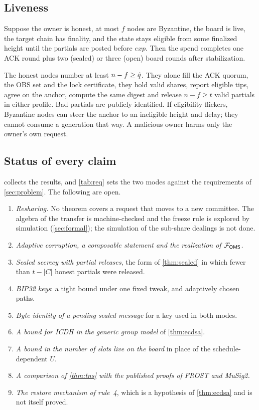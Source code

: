 \subsection{Liveness}

\begin{proposition}\label{prop:live}
Suppose the owner is honest, at most $f$ nodes are Byzantine, the board is live, the target chain has finality, and the state stays eligible from some finalized height until the partials are posted before $exp$. Then the spend completes one ACK round plus two (sealed) or three (open) board rounds after stabilization.
\end{proposition}

The honest nodes number at least $n - f \ge \hat{q}$. They alone fill the ACK quorum, the OBS set and the lock certificate, they hold valid shares, report eligible tips, agree on the anchor, compute the same digest and release $n - f \ge t$ valid partials in either profile. Bad partials are publicly identified. If eligibility flickers, Byzantine nodes can steer the anchor to an ineligible height and delay; they cannot consume a generation that way. A malicious owner harms only the owner's own request.

\subsection{Status of every claim}\label{sec:status}

 collects the results, and \cref{tab:req} sets the two modes against the requirements of \cref{sec:problem}. The following are open.

\begin{enumerate}[leftmargin=1.7em,itemsep=1pt]
\item \emph{Resharing.} No theorem covers a request that moves to a new committee. The algebra of the transfer is machine-checked and the freeze rule is explored by simulation (\cref{sec:formal}); the simulation of the sub-share dealings is not done.
\item \emph{Adaptive corruption, a composable statement and the realization of $\mathcal{F}_{\mathsf{OMS}}$.}
\item \emph{Sealed secrecy with partial releases}, the form of \cref{thm:sealed} in which fewer than $t - |C|$ honest partials were released.
\item \emph{BIP32 keys}: a tight bound under one fixed tweak, and adaptively chosen paths.
\item \emph{Byte identity of a pending sealed message} for a key used in both modes.
\item \emph{A bound for ICDH in the generic group model} of \cref{thm:ecdsa}.
\item \emph{A bound in the number of slots live on the board} in place of the schedule-dependent $U$.
\item \emph{A comparison of \cref{thm:tns} with the published proofs of FROST and MuSig2.}
\item \emph{The restore mechanism of rule~4}, which is a hypothesis of \cref{thm:ecdsa} and is not itself proved.
\end{enumerate}

